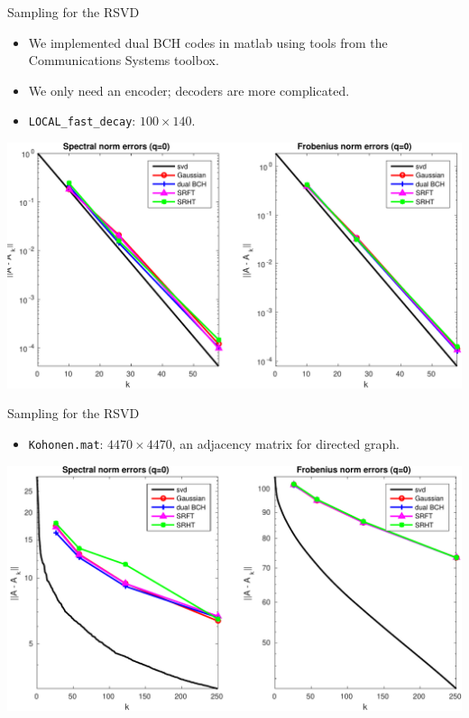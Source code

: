 \documentclass[9pt]{beamer}
\begin{document}
\begin{frame}{Sampling for the RSVD}
   \begin{itemize}
      \item We implemented dual BCH codes in {\sc matlab} using tools from the Communications Systems toolbox.\\
      \item We only need an encoder; decoders are more complicated.
      \item \texttt{LOCAL\_fast\_decay}: $100\times 140$.
   \end{itemize}
   
   \begin{center}
      \includegraphics[width=\textwidth]{figures/fast_decay_rsvd_compare_trim.pdf}
   \end{center}
\end{frame}

\begin{frame}{Sampling for the RSVD}
   \begin{itemize}
      \item \texttt{Kohonen.mat}: $4470\times 4470$, an adjacency matrix for directed graph.
   \end{itemize}
   
   \begin{center}
      \includegraphics[width=\textwidth]{figures/kohonen_rsvd_compare_trim.pdf}
   \end{center}
\end{frame}
\end{document}

